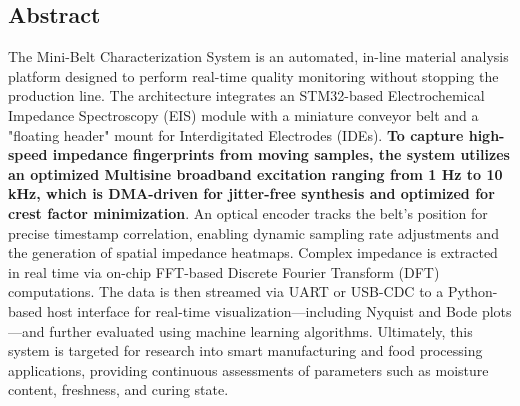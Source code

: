 \subsection{Abstract}
The Mini-Belt Characterization System is an automated, in-line material analysis platform designed to perform real-time quality monitoring without stopping the production line. The architecture integrates an STM32-based Electrochemical Impedance Spectroscopy (EIS) module with a miniature conveyor belt and a "floating header" mount for Interdigitated Electrodes (IDEs). \textbf{To capture high-speed impedance fingerprints from moving samples, the system utilizes an optimized Multisine broadband excitation ranging from 1 Hz to 10 kHz, which is DMA-driven for jitter-free synthesis and optimized for crest factor minimization}. An optical encoder tracks the belt's position for precise timestamp correlation, enabling dynamic sampling rate adjustments and the generation of spatial impedance heatmaps. Complex impedance is extracted in real time via on-chip FFT-based Discrete Fourier Transform (DFT) computations. The data is then streamed via UART or USB-CDC to a Python-based host interface for real-time visualization—including Nyquist and Bode plots—and further evaluated using machine learning algorithms. Ultimately, this system is targeted for research into smart manufacturing and food processing applications, providing continuous assessments of parameters such as moisture content, freshness, and curing state.


